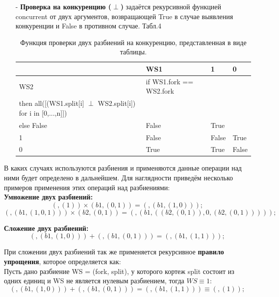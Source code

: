\documentclass[a4paper,12pt]{article}
\begin{document}
\begin{enumerate}
\item[-] \textbf{Проверка на конкуренцию ($\perp$)}  задаётся рекурсивной функцией concurrent от двух аргументов, возвращающей  True в случае выявления конкуренции и False в противном случае. Табл.4

\begin{table}[!h]
\centering
\caption{Функция проверки двух разбиений на конкуренцию, представленная в виде таблицы. }\label{tab:conc}
    \begin{tabular}{|l|>{\centering}m{8cm} |l|l|}
    \hline
    ~   & WS1                                                                                   & 1     & 0     \\ \hline
    WS2 & if WS1.fork == WS2.fork \\
    then all([(WS1.split[i] $\perp$ WS2.split[i]) for i in [0,...,n]])\\
     else False & False & True  \\ \hline
    1   & False                                                                                 & False & True  \\ \hline
    0   & True                                                                                  & True  & False \\ \hline
    \end{tabular}

\end{table}

\end{enumerate}

В каких случаях используются  разбиения и применяются данные операции над ними будет определено в дальнейшем. Для наглядности приведём несколько примеров применения этих операций над разбиениями:\\

\textbf{Умножение двух разбиений:}
\begin{equation}
	(, (1)) \times (b1, (0,1)) = (, (b1, (1,0)));
	\nonumber
\end{equation}
\begin{equation}
	(, (b1, (1,0, 1))) \times (b2, (0,1)) = (, (b1, ((b2, (0,1)),0, (b2, (0,1)))));
	\nonumber
\end{equation}

\textbf{Сложение двух разбиений:}
\begin{equation}
	(, (b1, (1,0))) + (, (b1, (0,1))) = (, (b1, (1,1))); 
	\nonumber
\end{equation}

При сложении двух разбиений так же применяется рекурсивное \textbf{правило упрощения}, которое определяется как:\\
 Пусть дано разбиение WS = (fork, split), у которого кортеж split состоит из одних единиц и WS не является нулевым разбиением, тогда $WS \equiv 1$:
\begin{equation}
	(, (b1, (1,0))) + (, (b1, (0,1))) = (, (b1, (1,1))) \equiv (, (1));
	\nonumber
\end{equation}
\end{document}

